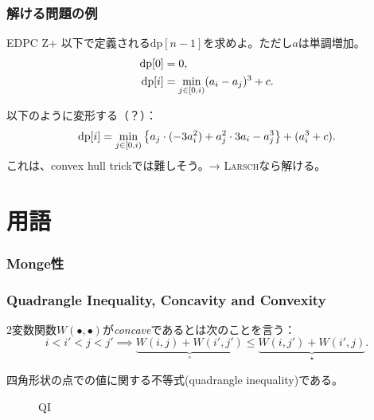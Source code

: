 \documentclass[
  lualatex,
  ja=standard,
  compress,
  hyperref={colorlinks, urlcolor=magenta, linkcolor=blue!55!black},
  dvipsnames,
  svgnames,
]{beamer}
\newcommand{\DP}{\mathrm{dp}}
\newcommand{\placeholder}{\bullet}
\begin{document}
\begin{frame}
  \frametitle{解ける問題の例 \theslidetopic}

  \begin{block}{EDPC Z+}
    以下で定義される$\DP[n - 1]$を求めよ。ただし$a$は単調増加。
    $$
    \begin{aligned}
    \DP[0] &= 0, \\
    \DP[i] &= \min_{j\in\halfco{0}{i}} (a_i-a_j)^3+c. \\
    \end{aligned}
    $$
  \end{block}
  以下のように変形する（？）：
  $$
  \DP[i] = \min_{j\in\halfco{0}{i}} \left\{a_j\cdot (-3a_i^2)+a_j^2\cdot 3a_i-a_j^3\right\}+(a_i^3+c).
  $$
  これは、convex hull trickでは難しそう。→ \textsc{Larsch}なら解ける。
\end{frame}

\section{用語}
\begin{frame}
  \frametitle{Monge性}

\end{frame}

\begin{frame}
  \frametitle{Quadrangle Inequality, Concavity and Convexity}

  2変数関数$W(\placeholder, \placeholder)$が\emph{concave}であるとは次のことを言う：
  $$
  i<i'<j<j' \implies \underbrace{W(i, j) + W(i', j')}_{\circ} \le \underbrace{W(i, j') + W(i', j)}_{\star}.
  $$

  四角形状の点での値に関する不等式(quadrangle inequality)である。
  \begin{figure}
    \caption{QI}
    
  \end{figure}
\end{frame}
\end{document}
